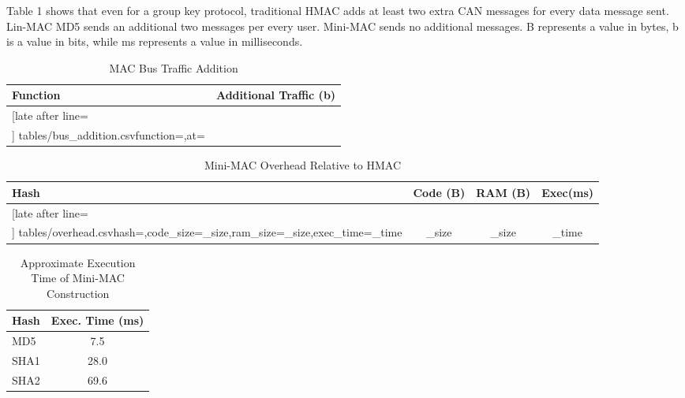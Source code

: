 Table 1 shows that even for a group key protocol, traditional HMAC adds at least two extra CAN messages for every data message sent. Lin-MAC MD5 sends an additional two messages per every user. Mini-MAC sends no additional messages. B represents a value in bytes, b is a value in bits, while ms represents a value in milliseconds.
	
	\begin{table}
	\centering
	\caption{MAC Bus Traffic Addition}
	\vspace{8pt}
	\begin{tabular}{|l|c|}\hline%
	\bfseries Function & \bfseries Additional Traffic (b) \\\hline \csvreader[late after line=\\]%
		{tables/bus_addition.csv}{function=\function,at=\at}%
		{\function & \at}%
		\hline
	\end{tabular}
	\end{table}

	\begin{table}	
	\centering	
	\caption{Mini-MAC Overhead Relative to HMAC}
	\vspace{8pt}
	\begin{tabular}{|l|c|c|c|}\hline%
	\bfseries Hash & \bfseries Code (B) & \bfseries RAM (B) & \bfseries Exec(ms)\\\hline \csvreader[late after line=\\]%
		{tables/overhead.csv}{hash=\hash,code_size=\code_size,ram_size=\ram_size,exec_time=\exec_time}%
		{\hash & \code_size & \ram_size & \exec_time}%
		\hline
	\end{tabular}
	\end{table}
	
	\begin{table}
	\centering
	\caption{Approximate Execution Time of Mini-MAC Construction}
	\vspace{8pt}
	\begin{tabular}{| @{}l | S[table-format=2.1] | @{}}
		\hline 
		\hspace{2pt}\textbf{Hash} & {\textbf{Exec. Time (ms)}} \\
		\hline 
		\hspace{2pt}MD5 & 7.5 \\
		\hspace{2pt}SHA1 & 28.0 \\
		\hspace{2pt}SHA2 & 69.6 \\ 
		\hline
	\end{tabular}	
	\end{table}
	
